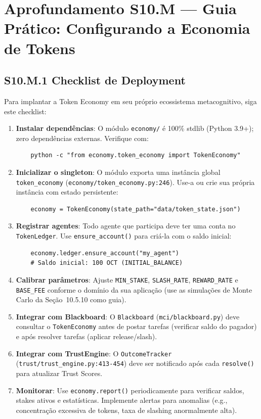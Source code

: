 \section*{Aprofundamento S10.M --- Guia Prático: Configurando a Economia de Tokens}

\subsection*{S10.M.1 Checklist de Deployment}

Para implantar a Token Economy em seu próprio ecossistema metacognitivo, siga este checklist:

\begin{enumerate}
    \item \textbf{Instalar dependências}: O módulo \texttt{economy/} é 100\% stdlib (Python 3.9+); zero dependências externas. Verifique com:
    \begin{verbatim}
    python -c "from economy.token_economy import TokenEconomy"
    \end{verbatim}
    
    \item \textbf{Inicializar o singleton}: O módulo exporta uma instância global \texttt{token\_economy} (\texttt{economy/token\_economy.py:246}). Use-a ou crie sua própria instância com estado persistente:
    \begin{verbatim}
    economy = TokenEconomy(state_path="data/token_state.json")
    \end{verbatim}
    
    \item \textbf{Registrar agentes}: Todo agente que participa deve ter uma conta no \texttt{TokenLedger}. Use \texttt{ensure\_account()} para criá-la com o saldo inicial:
    \begin{verbatim}
    economy.ledger.ensure_account("my_agent")
    # Saldo inicial: 100 OCT (INITIAL_BALANCE)
    \end{verbatim}
    
    \item \textbf{Calibrar parâmetros}: Ajuste \texttt{MIN\_STAKE}, \texttt{SLASH\_RATE}, \texttt{REWARD\_RATE} e \texttt{BASE\_FEE} conforme o domínio da sua aplicação (use as simulações de Monte Carlo da Seção~10.5.10 como guia).
    
    \item \textbf{Integrar com Blackboard}: O \texttt{Blackboard} (\texttt{mci/blackboard.py}) deve consultar o \texttt{TokenEconomy} antes de postar tarefas (verificar saldo do pagador) e após resolver tarefas (aplicar release/slash).
    
    \item \textbf{Integrar com TrustEngine}: O \texttt{OutcomeTracker} (\texttt{trust/trust\_engine.py:413-454}) deve ser notificado após cada \texttt{resolve()} para atualizar Trust Scores.
    
    \item \textbf{Monitorar}: Use \texttt{economy.report()} periodicamente para verificar saldos, stakes ativos e estatísticas. Implemente alertas para anomalias (e.g., concentração excessiva de tokens, taxa de slashing anormalmente alta).
\end{enumerate}

